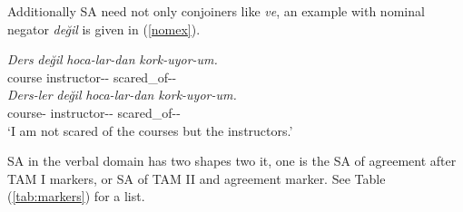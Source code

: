 Additionally SA need not only conjoiners like \textit{ve}, an example with nominal negator \textit{değil} is given in (\ref{nomex}).

\begin{exe}
    \ex \label{nomex4}
    \begin{xlist}
        \ex
        \gll 
        \textit{Ders} \textit{değil} \textit{hoca-lar-dan} \textit{kork-uyor-um.} \\ course {\Neg} instructor-{\Pl}-{\Abl} scared\_of-{\Prog}-{\First}{\Sg} \\

        \ex
        \gll 
        \textit{Ders-ler} \textit{değil} \textit{hoca-lar-dan} \textit{kork-uyor-um.} \\ course-{\Pl} {\Neg} instructor-{\Pl}-{\Abl} scared\_of-{\Prog}-{\First}{\Sg} \\
        \glt `I am not scared of the courses but the instructors.'
    
    \end{xlist}

\end{exe}

SA in the verbal domain has two shapes two it, one is the SA of agreement after TAM I markers, or SA of TAM II and agreement marker. See Table (\ref{tab:markers}) for a list.

